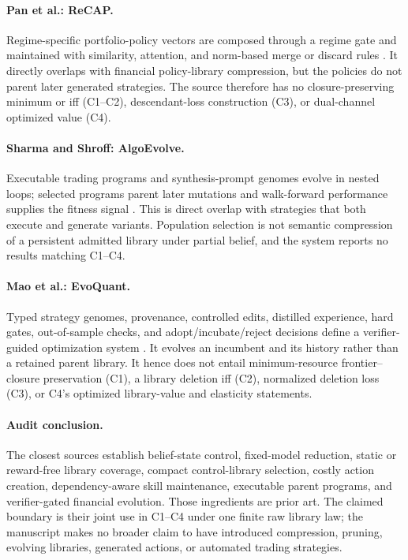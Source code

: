 \paragraph{Pan et al.: ReCAP.}
Regime-specific portfolio-policy vectors are composed through a regime gate
and maintained with similarity, attention, and norm-based merge or discard
rules \cite{PanEtAl2026ReCAP}.  It directly overlaps with financial
policy-library compression, but the policies do not parent later generated
strategies.  The source therefore has no closure-preserving minimum or iff
(C1--C2), descendant-loss construction (C3), or dual-channel optimized value
(C4).

\paragraph{Sharma and Shroff: AlgoEvolve.}
Executable trading programs and synthesis-prompt genomes evolve in nested
loops; selected programs parent later mutations and walk-forward performance
supplies the fitness signal \cite{SharmaShroff2026AlgoEvolve}.  This is direct
overlap with strategies that both execute and generate variants.  Population
selection is not semantic compression of a persistent admitted library under
partial belief, and the system reports no results matching C1--C4.

\paragraph{Mao et al.: EvoQuant.}
Typed strategy genomes, provenance, controlled edits, distilled experience,
hard gates, out-of-sample checks, and adopt/incubate/reject decisions define a
verifier-guided optimization system \cite{MaoEtAl2026EvoQuant}.  It evolves
an incumbent and its history rather than a retained parent library.  It hence
does not entail minimum-resource frontier--closure preservation (C1), a
library deletion iff (C2), normalized deletion loss (C3), or C4's optimized
library-value and elasticity statements.

\paragraph{Audit conclusion.}
The closest sources establish belief-state control, fixed-model reduction,
static or reward-free library coverage, compact control-library selection,
costly action creation, dependency-aware skill maintenance, executable parent
programs, and verifier-gated financial evolution.  Those ingredients are
prior art.  The claimed boundary is their joint use in C1--C4 under one finite
raw library law; the manuscript makes no broader claim to have introduced
compression, pruning, evolving libraries, generated actions, or automated
trading strategies.
